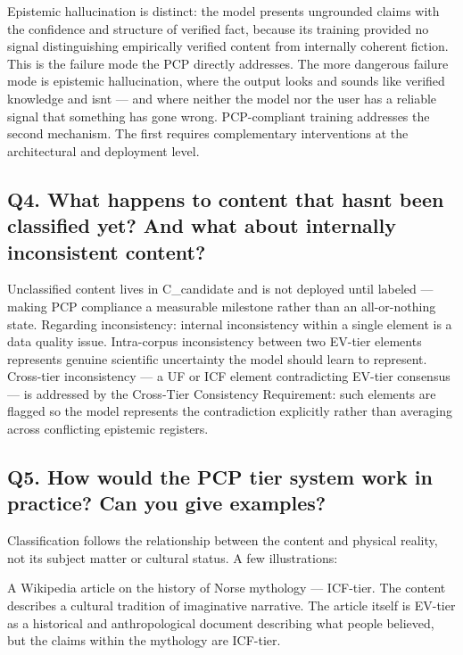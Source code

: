 \documentclass[
]{article}
\begin{document}
Epistemic hallucination is distinct: the model presents ungrounded
claims with the confidence and structure of verified fact, because its
training provided no signal distinguishing empirically verified content
from internally coherent fiction. This is the failure mode the PCP
directly addresses. The more dangerous failure mode is epistemic
hallucination, where the output looks and sounds like verified knowledge
and isn\textquotesingle t --- and where neither the model nor the user
has a reliable signal that something has gone wrong. PCP-compliant
training addresses the second mechanism. The first requires
complementary interventions at the architectural and deployment level.

\subsection{Q4. What happens to content that hasn\textquotesingle t been
classified yet? And what about internally inconsistent
content?}\label{q4.-what-happens-to-content-that-hasnt-been-classified-yet-and-what-about-internally-inconsistent-content}

Unclassified content lives in C\_candidate and is not deployed until
labeled --- making PCP compliance a measurable milestone rather than an
all-or-nothing state. Regarding inconsistency: internal inconsistency
within a single element is a data quality issue. Intra-corpus
inconsistency between two EV-tier elements represents genuine scientific
uncertainty the model should learn to represent. Cross-tier
inconsistency --- a UF or ICF element contradicting EV-tier consensus
--- is addressed by the Cross-Tier Consistency Requirement: such
elements are flagged so the model represents the contradiction
explicitly rather than averaging across conflicting epistemic registers.

\subsection{Q5. How would the PCP tier system work in practice? Can you
give
examples?}\label{q5.-how-would-the-pcp-tier-system-work-in-practice-can-you-give-examples}

Classification follows the relationship between the content and physical
reality, not its subject matter or cultural status. A few illustrations:

A Wikipedia article on the history of Norse mythology --- ICF-tier. The
content describes a cultural tradition of imaginative narrative. The
article itself is EV-tier as a historical and anthropological document
describing what people believed, but the claims within the mythology are
ICF-tier.
\end{document}
